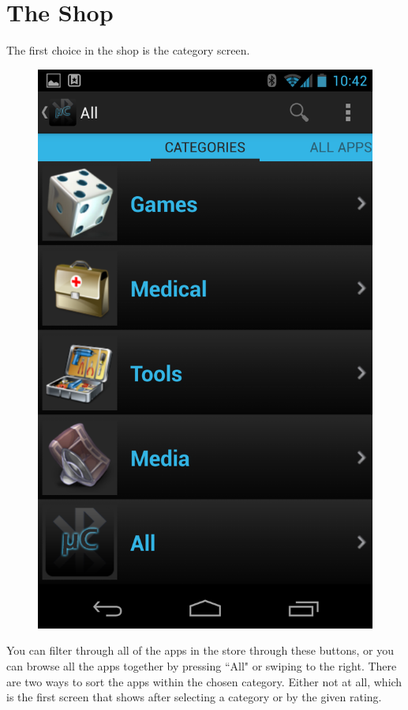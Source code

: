 \chapter{The Shop}
The first choice in the shop is the category screen.\\
\newline
\begin{figure}[H]
	\centering
	\includegraphics[scale = 0.3]{images/Screenshots/category_view.png}
\end{figure}
\newline
You can filter through all of the apps in the store through these buttons, or you can browse all the apps together by pressing ``All" or swiping to the right. There are two ways to sort the apps within the chosen category. Either not at all, which is the first screen that shows after selecting a category or by the given rating. \\
